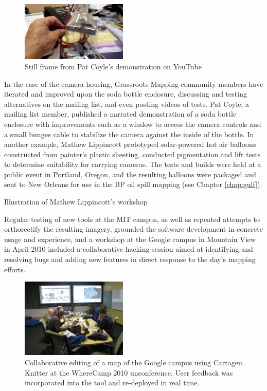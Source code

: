 \documentclass[11pt]{report}
\begin{document}
\begin{figure}
	\begin{flushright}
		\includegraphics[width=0.45\textwidth]{images/pat-coyle-video.png}
		\caption{Still frame from Pat Coyle's demonstration on YouTube\cite{coyle2010sodabottle}}
	\end{flushright}
\end{figure}

In the case of the camera housing, Grassroots Mapping community members have iterated and improved upon the soda bottle enclosure, discussing and testing alternatives on the mailing list, and even posting videos of tests. Pat Coyle, a mailing list member, published a narrated demonstration of a soda bottle enclosure with improvements such as a window to access the camera controls and a small bungee cable to stabilize the camera against the inside of the bottle. In another example, Mathew Lippincott prototyped solar-powered hot air balloons constructed from painter's plastic sheeting, conducted pigmentation and lift tests to determine suitability for carrying cameras. The tests and builds were held at a public event in Portland, Oregon, and the resulting balloons were packaged and sent to New Orleans for use in the BP oil spill mapping (see Chapter \ref{chap:gulf}). 

Illustration of Mathew Lippincott's workshop 

Regular testing of new tools at the MIT campus, as well as repeated attempts to orthorectify the resulting imagery, grounded the software development in concrete usage and experience, and a workshop at the Google campus in Mountain View in April 2010 included a collaborative hacking session aimed at identifying and resolving bugs and adding new features in direct response to the day's mapping efforts. 

\begin{figure}
	\begin{flushright}
		\includegraphics[width=0.45\textwidth]{images/asynchronous-editing.jpg}
		\caption{Collaborative editing of a map of the Google campus using Cartagen Knitter at the WhereCamp 2010 unconference. User feedback was incorporated into the tool and re-deployed in real time.}
	\end{flushright}
\end{figure}
\end{document}

